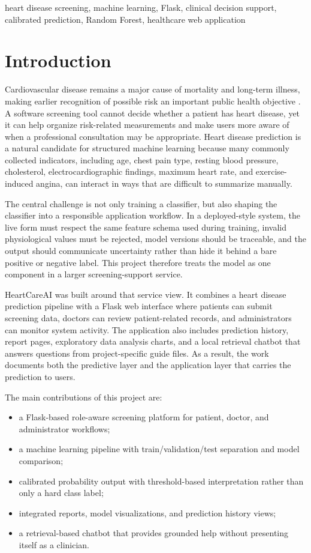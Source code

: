 \documentclass[conference]{IEEEtran}
\begin{document}
\begin{IEEEkeywords}
heart disease screening, machine learning, Flask, clinical decision support, calibrated prediction, Random Forest, healthcare web application
\end{IEEEkeywords}

\section{Introduction}
Cardiovascular disease remains a major cause of mortality and long-term illness, making earlier recognition of possible risk an important public health objective \cite{who_cvd}. A software screening tool cannot decide whether a patient has heart disease, yet it can help organize risk-related measurements and make users more aware of when a professional consultation may be appropriate. Heart disease prediction is a natural candidate for structured machine learning because many commonly collected indicators, including age, chest pain type, resting blood pressure, cholesterol, electrocardiographic findings, maximum heart rate, and exercise-induced angina, can interact in ways that are difficult to summarize manually.

The central challenge is not only training a classifier, but also shaping the classifier into a responsible application workflow. In a deployed-style system, the live form must respect the same feature schema used during training, invalid physiological values must be rejected, model versions should be traceable, and the output should communicate uncertainty rather than hide it behind a bare positive or negative label. This project therefore treats the model as one component in a larger screening-support service.

HeartCareAI was built around that service view. It combines a heart disease prediction pipeline with a Flask web interface where patients can submit screening data, doctors can review patient-related records, and administrators can monitor system activity. The application also includes prediction history, report pages, exploratory data analysis charts, and a local retrieval chatbot that answers questions from project-specific guide files. As a result, the work documents both the predictive layer and the application layer that carries the prediction to users.

The main contributions of this project are:
\begin{itemize}
    \item a Flask-based role-aware screening platform for patient, doctor, and administrator workflows;
    \item a machine learning pipeline with train/validation/test separation and model comparison;
    \item calibrated probability output with threshold-based interpretation rather than only a hard class label;
    \item integrated reports, model visualizations, and prediction history views;
    \item a retrieval-based chatbot that provides grounded help without presenting itself as a clinician.
\end{itemize}
\end{document}
